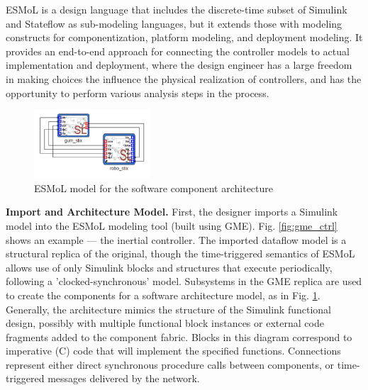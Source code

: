 ESMoL is a design language that includes the discrete-time subset of Simulink and Stateflow as sub-modeling languages, but it extends those with modeling constructs for componentization, platform modeling, and deployment modeling. It provides an end-to-end approach for connecting the controller models to actual implementation and deployment, where the design engineer has a large freedom in making choices the influence the physical realization of controllers, and has the opportunity to perform various analysis steps in the process.


\begin{figure}[ht]
\centering
\includegraphics[height=1in]{figures/sw_arch.jpg}
    \caption{ESMoL model for the software component architecture}
    \label{fig:sw_arch}
\end{figure}

\textbf{Import and Architecture Model.} First, the designer imports a Simulink model into the ESMoL modeling tool (built using GME).  Fig. \ref{fig:gme_ctrl} shows an example --- the inertial controller.  The imported dataflow model is a structural replica of the original, though the time-triggered semantics of ESMoL allows use of only Simulink blocks and structures that execute periodically, following a 'clocked-synchronous' model. Subsystems in the GME replica are used to create the components for a software architecture model, as in Fig. \ref{fig:sw_arch}.  Generally, the architecture mimics the structure of the Simulink functional design, possibly with multiple functional block instances or external code fragments added to the component fabric.  Blocks in this diagram correspond to imperative (C) code that will implement the specified functions.  Connections represent either direct synchronous procedure calls between components, or time-triggered messages delivered by the network.


